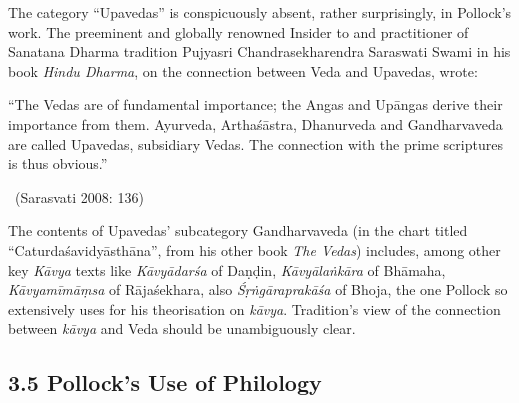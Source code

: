 \vskip -5pt

The category “Upavedas” is conspicuously absent, rather surprisingly, in Pollock’s work. The preeminent and globally renowned Insider to and practitioner of Sanatana Dharma tradition Pujyasri Chandrasekha\-rendra Saraswati Swami in his book \textit{Hindu Dharma}, on the connection between Veda and Upavedas, wrote:

\begin{myquote}
“The Vedas are of fundamental importance; the Angas and Upāngas derive their importance from them. Ayurveda, Arthaśāstra, Dhanurveda and Gandharvaveda are called Upavedas, subsidiary Vedas. The connection with the prime scriptures is thus obvious.” 

~\hfill (Sarasvati 2008: 136)
\end{myquote}

The contents of Upavedas’ subcategory Gandharvaveda (in the chart titled “Caturdaśavidyāsthāna”, from his other book \textit{The Vedas}) includes, among other key \textit{Kāvya} texts like \textit{Kāvyādarśa} of Daṇḍin, \textit{Kāvyālaṅkāra} of Bhāmaha, \textit{Kāvyamīmāṃsa} of Rājaśekhara, also \textit{Śṛṅgāraprakāśa} of Bhoja, the one Pollock so extensively uses for his theorisation on \textit{kāvya}. Tradition’s view of the connection between \textit{kāvya} and Veda should be unambiguously clear.


\subsection*{3.5 Pollock’s Use of Philology}

\vskip -5pt

